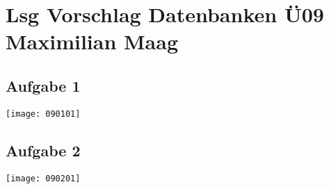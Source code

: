 \documentclass{article}
\begin{document}
	\section*{Lsg Vorschlag Datenbanken Ü09 Maximilian Maag}
	\subsection*{Aufgabe 1}
	\texttt{[image: 090101]}
	\subsection*{Aufgabe 2}
	\texttt{[image: 090201]}
\end{document}
